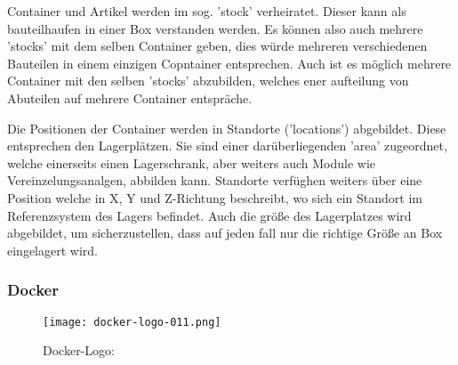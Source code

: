 Container und Artikel werden im sog. 'stock' verheiratet. Dieser kann als bauteilhaufen in einer Box verstanden werden. Es können also auch mehrere 'stocks' mit dem selben Container geben, dies würde mehreren verschiedenen Bauteilen in einem einzigen Copntainer entsprechen. Auch ist es möglich mehrere Container mit den selben 'stocks' abzubilden, welches ener aufteilung von Abuteilen auf mehrere Container entspräche.

Die Positionen der Container werden in Standorte ('locations') abgebildet. Diese entsprechen den Lagerplätzen. Sie sind einer darüberliegenden 'area' zugeordnet, welche einerseits einen Lagerschrank, aber weiters auch Module wie Vereinzelungsanalgen, abbilden kann. Standorte verfüghen weiters über eine Position welche in X, Y und Z-Richtung beschreibt, wo sich ein Standort im Referenzsystem des Lagers befindet. Auch die größe des Lagerplatzes wird abgebildet, um sicherzustellen, dass auf jeden fall nur die richtige Größe an Box eingelagert wird.


\subsubsection{Docker}

    \begin{wrapfigure}{r}{0.3\textwidth} %
        \vspace{-20px}
        \texttt{[image: docker-logo-011.png]} %
        \caption{Docker-Logo: \cite{docker_logo}}
    \end{wrapfigure}

